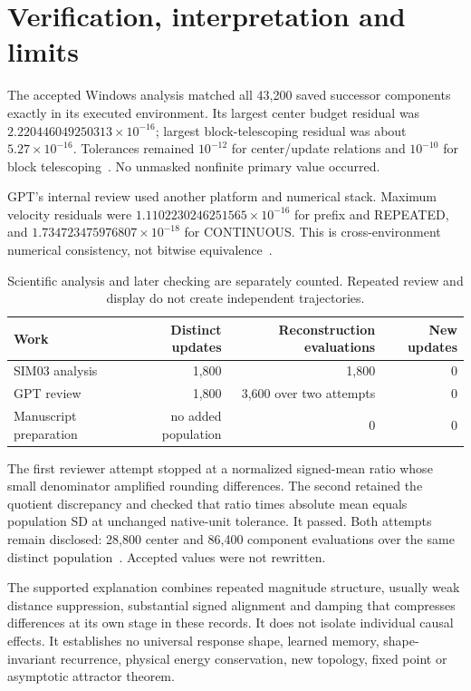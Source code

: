 \documentclass[11pt,a4paper]{article}
\newcommand{\RPT}{\textnormal{REPEATED}}
\newcommand{\CONT}{\textnormal{CONTINUOUS}}
\begin{document}
\clearpage
\section{Verification, interpretation and limits}
\label{sec:limits}
The accepted Windows analysis matched all 43,200 saved successor components exactly in its executed environment. Its largest center budget residual was $2.220446049250313\times10^{-16}$; largest block-telescoping residual was about $5.27\times10^{-16}$. Tolerances remained $10^{-12}$ for center/update relations and $10^{-10}$ for block telescoping~\cite{qa}. No unmasked nonfinite primary value occurred.

GPT's internal review used another platform and numerical stack. Maximum velocity residuals were $1.1102230246251565\times10^{-16}$ for prefix and \RPT, and $1.734723475976807\times10^{-18}$ for \CONT. This is cross-environment numerical consistency, not bitwise equivalence~\cite{review}.

\begin{table}[ht]
\centering\small
\begin{tabular}{lrrr}
\toprule
Work & Distinct updates & Reconstruction evaluations & New updates\\
\midrule
SIM03 analysis & 1,800 & 1,800 & 0\\
GPT review & 1,800 & 3,600 over two attempts & 0\\
Manuscript preparation & no added population & 0 & 0\\
\bottomrule
\end{tabular}
\caption{\small Scientific analysis and later checking are separately counted. Repeated review and display do not create independent trajectories.}
\label{tab:accounting}
\end{table}

The first reviewer attempt stopped at a normalized signed-mean ratio whose small denominator amplified rounding differences. The second retained the quotient discrepancy and checked that ratio times absolute mean equals population SD at unchanged native-unit tolerance. It passed. Both attempts remain disclosed: 28,800 center and 86,400 component evaluations over the same distinct population~\cite{reviewaccount}. Accepted values were not rewritten.

The supported explanation combines repeated magnitude structure, usually weak distance suppression, substantial signed alignment and damping that compresses differences at its own stage in these records. It does not isolate individual causal effects. It establishes no universal response shape, learned memory, shape-invariant recurrence, physical energy conservation, new topology, fixed point or asymptotic attractor theorem.
\end{document}
